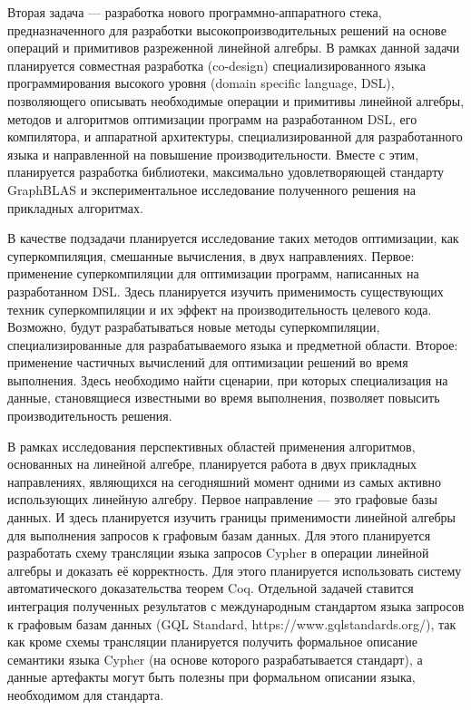 \documentclass[12pt]{article}  %
\theoremstyle{remark}
\begin{document}
Вторая задача --- разработка нового программно-аппаратного стека, предназначенного для разработки высокопроизводительных решений на основе операций и примитивов разреженной линейной алгебры. В рамках данной задачи планируется совместная разработка (co-design) специализированного языка программирования высокого уровня (domain specific language, DSL), позволяющего описывать необходимые операции и примитивы линейной алгебры, методов и алгоритмов оптимизации программ на разработанном DSL, его компилятора, и аппаратной архитектуры, специализированной для разработанного языка и направленной на повышение производительности. Вместе с этим, планируется разработка библиотеки, максимально удовлетворяющей стандарту GraphBLAS и экспериментальное исследование полученного решения на прикладных алгоритмах.

В качестве подзадачи планируется исследование таких методов оптимизации, как суперкомпиляция, смешанные вычисления, в двух направлениях. Первое: применение суперкомпиляции для оптимизации программ, написанных на разработанном DSL. Здесь планируется изучить применимость существующих техник суперкомпиляции и их эффект на производительность целевого кода. Возможно, будут разрабатываться новые методы суперкомпиляции, специализированные для разрабатываемого языка и предметной области. Второе: применение частичных вычислений для оптимизации решений во время выполнения. Здесь необходимо найти сценарии, при которых специализация на данные, становящиеся известными во время выполнения, позволяет повысить производительность решения.

В рамках исследования перспективных областей применения алгоритмов, основанных на линейной алгебре, планируется работа в двух прикладных направлениях, являющихся на сегодняшний момент одними из самых активно использующих линейную алгебру. Первое направление --- это графовые базы данных. И здесь планируется изучить границы применимости линейной алгебры для выполнения запросов к графовым базам данных. Для этого планируется разработать схему трансляции языка запросов Cypher в операции линейной алгебры и доказать её корректность. Для этого планируется использовать систему автоматического доказательства теорем Coq. Отдельной задачей ставится интеграция полученных результатов с международным стандартом языка запросов к графовым базам данных (GQL Standard, https://www.gqlstandards.org/), так как кроме схемы трансляции планируется получить формальное описание семантики языка Cypher (на основе которого разрабатывается стандарт), а данные артефакты могут быть полезны при формальном описании языка, необходимом для стандарта.
\end{document}

